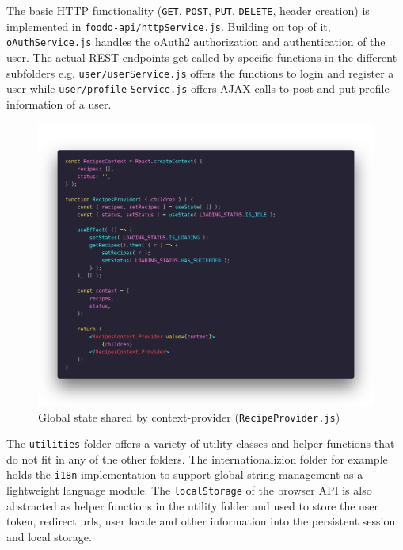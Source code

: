 The basic HTTP functionality (\texttt{GET}, \texttt{POST}, \texttt{PUT}, \texttt{DELETE}, header creation) is implemented in \texttt{foodo-api/httpService.js}. Building on top of it, \texttt{oAuthService.js} handles the oAuth2 authorization and authentication of the user. The actual REST endpoints get called by specific functions in the different subfolders e.g. \texttt{user/userService.js} offers the functions to login and register a user while \texttt{user/profile} \texttt{Service.js} offers AJAX calls to post and put profile information of a user. \vspace{6em}

\begin{figure}[!ht]
	\captionsetup{justification=centering}
	\centering
	\includegraphics[scale=0.28]{Ressourcen/img/code/context.png}
	\vspace{-4em}
	\caption{Global state shared by context-provider (\texttt{RecipeProvider.js})}
	\label{fig:provider}
	\vspace{3em}
\end{figure}

The \texttt{utilities} folder offers a variety of utility classes and helper functions that do not fit in any of the other folders. The internationalizion folder for example holds the \texttt{i18n} implementation to support global string management as a lightweight language module. The \texttt{localStorage} of the browser API is also abstracted as helper functions in the utility folder and used to store the user token, redirect urls, user locale and other information into the persistent session and local storage. 
\clearpage

